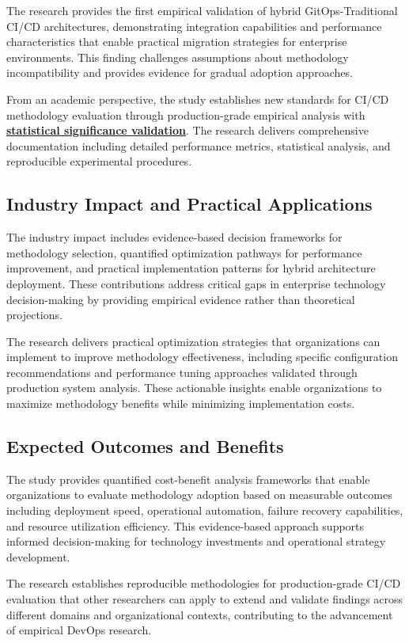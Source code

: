 The research provides the first empirical validation of hybrid GitOps-Traditional CI/CD architectures, demonstrating integration capabilities and performance characteristics that enable practical migration strategies for enterprise environments. This finding challenges assumptions about methodology incompatibility and provides evidence for gradual adoption approaches.

From an academic perspective, the study establishes new standards for CI/CD methodology evaluation through production-grade empirical analysis with \textbf{\hyperref[cohen1988statistical]{statistical significance validation}}. The research delivers comprehensive documentation including detailed performance metrics, statistical analysis, and reproducible experimental procedures.

\subsection{Industry Impact and Practical Applications}
The industry impact includes evidence-based decision frameworks for methodology selection, quantified optimization pathways for performance improvement, and practical implementation patterns for hybrid architecture deployment. These contributions address critical gaps in enterprise technology decision-making by providing empirical evidence rather than theoretical projections.

The research delivers practical optimization strategies that organizations can implement to improve methodology effectiveness, including specific configuration recommendations and performance tuning approaches validated through production system analysis. These actionable insights enable organizations to maximize methodology benefits while minimizing implementation costs.

\subsection{Expected Outcomes and Benefits}
The study provides quantified cost-benefit analysis frameworks that enable organizations to evaluate methodology adoption based on measurable outcomes including deployment speed, operational automation, failure recovery capabilities, and resource utilization efficiency. This evidence-based approach supports informed decision-making for technology investments and operational strategy development.

The research establishes reproducible methodologies for production-grade CI/CD evaluation that other researchers can apply to extend and validate findings across different domains and organizational contexts, contributing to the advancement of empirical DevOps research.

